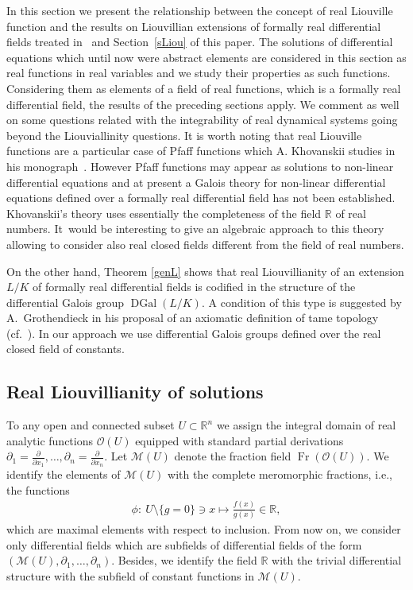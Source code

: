 \documentclass[pdftex]{sigma}%
\numberwithin{equation}{section}
\newcommand{\R}{\mathbb{R}}
\def \DGal{\operatorname{DGal}}
\begin{document}
In this section we present the relationship between the concept of real Liouville function and the results on Liouvillian extensions of formally real differential fields treated in~\cite {CH} and Section~\ref{sLiou} of this paper. The solutions of differential equations which until now were abstract elements are considered in this section as real functions in real variables and we study their properties as such functions. Considering them as elements of a field of real functions, which is a formally real differential field, the results of the preceding sections apply. We comment as well on some questions related with the integrability of real dynamical systems going beyond the Liouviallinity questions. It is worth noting that real Liouville functions are a particular case of Pfaff functions which A. Khovanskii studies in his monograph~\cite{Kh}. However Pfaff functions may appear as solutions to non-linear differential equations and at present a Galois theory for non-linear differential equations defined over a formally real differential field has not been established. Khovanskii's theory uses essentially the completeness of the field $\R$ of real numbers. It~would be interesting to give an algebraic approach to this theory allowing to consider also real closed fields different from the field of real numbers.

{\sloppy
On the other hand, Theorem \ref{genL} shows that real Liouvillianity of an extension $L/K$ of formally real differential fields is codified in the structure of the differential Galois group $\DGal(L/K)$. A condition of this type is suggested by A.~Grothendieck in his proposal of an axiomatic definition of tame topology (cf.~\cite[p.~272]{GGA}). In our approach we use differential Galois groups defined over the real closed field of constants.

}

\subsection{Real Liouvillianity of solutions}
To any open and connected subset $U \subset \R^n$ we assign the integral domain of real analytic functions $\mathcal{O}(U)$ equipped with standard partial derivations $\partial_1 = \frac{\partial}{\partial x_1}, \dots ,\partial_n = \frac{\partial}{\partial x_n}$. Let $\mathcal{M}(U)$ denote the fraction field $\operatorname{Fr}(\mathcal{O}(U))$. We identify the elements of $\mathcal{M}(U)$ with the complete meromorphic fractions, i.e., the functions
\begin{gather*}
\phi \colon\ U \setminus \{g=0\}\ni x \mapsto \frac{f(x)}{g(x)} \in \R,
\end{gather*}
which are maximal elements with respect to inclusion.
From now on, we consider only differential fields which are subfields of differential fields of the form $(\mathcal{M}(U),\partial_1, \dots, \partial_n)$. Besides, we identify the field $\R$ with the trivial differential structure with the subfield of constant functions in $\mathcal{M}(U)$.
\end{document}
